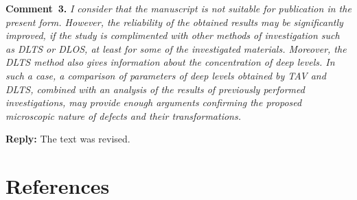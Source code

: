 \documentclass[10pt]{iopart}
\begin{document}
\vspace{1cm}
\noindent
\textcolor[rgb]{0.00,0.50,1.00}{\textbf{Comment~3.}}
\emph{I consider that the manuscript is not suitable for publication in the present form.
However, the reliability of the obtained results may be significantly improved,
if the study is complimented with other methods of investigation such as DLTS or DLOS,
at least for some of the investigated materials.
Moreover, the DLTS method also gives information about the concentration of deep levels.
In such a case, a comparison of parameters of deep levels obtained by TAV and DLTS,
combined with an analysis of the results of previously performed investigations,
may provide enough arguments confirming the
proposed microscopic nature of defects and their transformations.}

\noindent
\textcolor[rgb]{0.51,0.00,0.00}{\textbf{Reply:}}
The text was revised.

\cite{OstrovskiiSST}

\section*{References}



\end{document}
